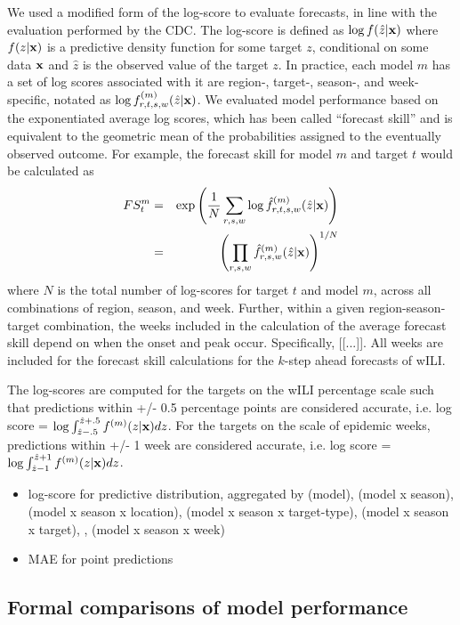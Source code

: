 \documentclass{article}
\begin{document}
We used a modified form of the log-score to evaluate forecasts, in line with the evaluation performed by the CDC. The log-score is defined as $\log f(\hat z|\bf{x})$ where $f(z|\bf{x})$ is a predictive density function for some target $z$, conditional on some data $\bf{x}$ and $\hat z$ is the observed value of the target $z$. In practice, each model $m$ has a set of log scores associated with it are region-, target-, season-, and week- specific, notated as $\log f^{(m)}_{r,t,s,w}(\hat z|\bf{x})$. We evaluated model performance based on the exponentiated average log scores, which has been called ``forecast skill'' and is equivalent to the geometric mean of the probabilities assigned to the eventually observed outcome. 
For example, the forecast skill for model $m$ and target $t$ would be calculated as
\begin{eqnarray}
 FS^{m}_{t} & = & \exp \left ( \frac{1}{N} \sum_{r,s,w} \log \hat f^{(m)}_{r,t,s,w}(\hat z|{\bf x}) \right ) \\
 & = & \left ( \prod_{r,s,w} \hat f^{(m)}_{r,s,w}(\hat z|{\bf x}) \right ) ^{1/N} 
\end{eqnarray}
where $N$ is the total number of log-scores for target $t$ and model $m$, across all combinations of region, season, and week. 
Further, within a given region-season-target combination, the weeks included in the calculation of the average forecast skill depend on when the onset and peak occur. Specifically, [[...]].
All weeks are included for the forecast skill calculations for the $k$-step ahead forecasts of wILI.

The log-scores are computed for the targets on the wILI percentage scale such that predictions within +/- 0.5 percentage points are considered accurate, i.e. log score = $\log \int_{\hat z -.5}^{\hat z + .5} f^{(m)}(z|{\bf{x}})dz$. For the targets on the scale of epidemic weeks, predictions within +/- 1 week are considered accurate, i.e. log score = $\log \int_{\hat z -1}^{\hat z + 1} f^{(m)}(z|{\bf{x}})dz$. 
\begin{itemize}
    \item log-score for predictive distribution, aggregated by (model), (model x season), (model x season x location), (model x season x target-type), (model x season x target), , (model x season x week)
    \item MAE for point predictions
\end{itemize}

\subsection{Formal comparisons of model performance}
\end{document}
